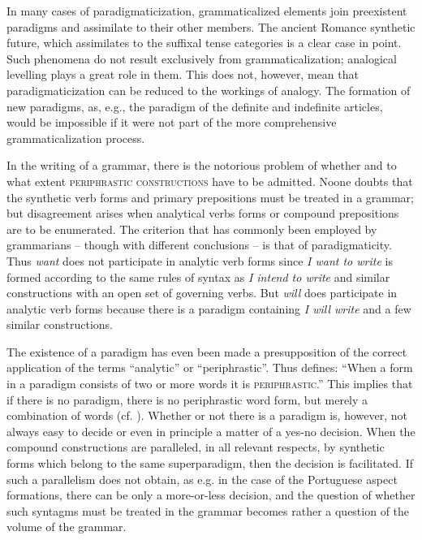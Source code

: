 In many cases of paradigmaticization, grammaticalized elements join preexistent paradigms and assimilate to their other members. The ancient Romance synthetic future, which assimilates to the suffixal tense categories is a clear case in point. Such phenomena do not result exclusively from grammaticalization; analogical levelling plays a great role in them. This does not, however, mean that paradigmaticization can be reduced to the workings of analogy. The formation of new paradigms, as, e.g., the paradigm of the definite and indefinite articles, would be impossible if it were not part of the more comprehensive grammaticalization process.

In the writing of a grammar, there is the notorious problem of whether and to what extent \textsc{periphrastic constructions} have to be admitted. Noone doubts that the synthetic verb forms and primary prepositions must be treated in a grammar; but disagreement arises when analytical verbs forms or compound prepositions are to be enumerated. The criterion that has commonly been employed by grammarians -- though with different conclusions -- is that of paradigmaticity. Thus \textit{want} does not participate in analytic verb forms since \textit{I want to write} is formed according to the same rules of syntax as \textit{I intend to write} and similar constructions with an open set of governing verbs. But \textit{will} does participate in analytic verb forms because there is a paradigm containing \textit{I will write} and a few similar constructions.%

The existence of a paradigm has even been made a presupposition of the correct application of the terms ``analytic'' or ``periphrastic''. Thus \citet[55]{Matthews1981} defines: “When a form in a paradigm consists of two or more words it is \textsc{periphrastic}.” This implies that if there is no paradigm, there is no periphrastic word form, but merely a combination of words (cf. \citealt[82--87]{Žirmunskij1966}). Whether or not there is a paradigm is, however, not always easy to decide or even in principle a matter of a yes-no decision. When the compound constructions are paralleled, in all relevant respects, by synthetic forms which belong to the same superparadigm, then the decision is facilitated. If such a parallelism does not obtain, as e.g. in the case of the Portuguese aspect formations, there can be only a more-or-less decision, and the question of whether such syntagms must be treated in the grammar becomes rather a question of the volume of the grammar.

